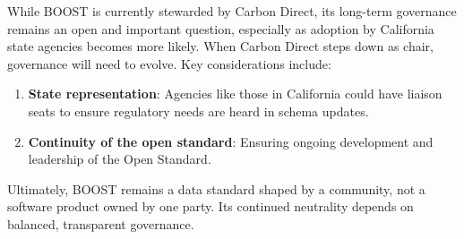 \documentclass[title=small,preset=opensansnote,par=skip]{article}
\begin{document}
While BOOST is currently stewarded by Carbon Direct, its long-term governance remains an open and important question, especially as adoption by California state agencies becomes more likely. When Carbon Direct steps down as chair, governance will need to evolve. Key considerations include:

\begin{enumerate}
\item \textbf{State representation}: Agencies like those in California could have liaison seats to ensure regulatory needs are heard in schema updates.

\item \textbf{Continuity of the open standard}: Ensuring ongoing development and leadership of the Open Standard.
\end{enumerate}

Ultimately, BOOST remains a data standard shaped by a community, not a software product owned by one party. Its continued neutrality depends on balanced, transparent governance.
\end{document}
